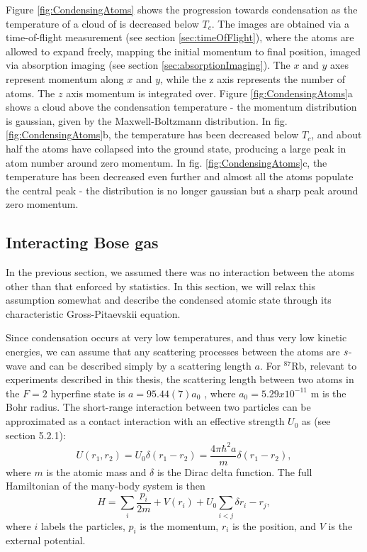 Figure \ref{fig:CondensingAtoms} shows the progression towards condensation as the temperature of a cloud of \Rb{} is decreased below $T_c$. The images are obtained via a time-of-flight measurement (see section \ref{sec:timeOfFlight}), where the atoms are allowed to expand freely, mapping the initial momentum to final position, imaged via absorption imaging (see section \ref{sec:absorptionImaging}). The $x$ and $y$ axes represent momentum along $x$ and $y$, while the z axis represents the number of atoms. The $z$ axis momentum is integrated over.  Figure \ref{fig:CondensingAtoms}a shows a cloud above the condensation temperature - the momentum distribution is gaussian, given by the Maxwell-Boltzmann distribution. In  fig. \ref{fig:CondensingAtoms}b, the temperature has been decreased below $T_c$, and about half the atoms have collapsed into the ground state, producing a large peak in atom number around zero momentum. In  fig. \ref{fig:CondensingAtoms}c, the temperature has been decreased even further and almost all the atoms populate the central peak - the distribution is no longer gaussian but a sharp peak around zero momentum. 


\subsection{Interacting Bose gas}

In the previous section, we assumed there was no interaction between the atoms other than that enforced by statistics. In this section, we will relax this assumption somewhat and describe the condensed atomic state through its characteristic Gross-Pitaevskii equation. 

Since condensation occurs at very low temperatures, and thus very low kinetic energies, we can assume that any scattering processes between the atoms are $\it{s}$-wave and can be described simply by a scattering length $a$. For $^{87}$Rb, relevant to experiments described in this thesis, the scattering length between two atoms in the $F=2$ hyperfine state is $a=95.44(7) a_0$ \cite{Egorov2013}, where $a_0=5.29x10^{-11}$ m is the Bohr radius. The short-range interaction between two particles can be approximated as a contact interaction with an effective strength $U_0$ as (see \cite{Pethick} section 5.2.1):
\begin{equation}
U(r_1,r_2) = U_0 \delta(r_1-r_2) = \frac{4\pi\hbar^2 a}{m} \delta(r_1-r_2),
\end{equation}
where $m$ is the atomic mass and $\delta$ is the Dirac delta function. The full Hamiltonian of the many-body system is then
\begin{equation}
H=\sum_i \frac{p_i}{2m} + V(r_i) + U_0\sum_{i<j}\delta{r_i-r_j},
\end{equation}
where $i$ labels the particles, $p_i$ is the momentum, $r_i$ is the position, and $V$ is the external potential.

